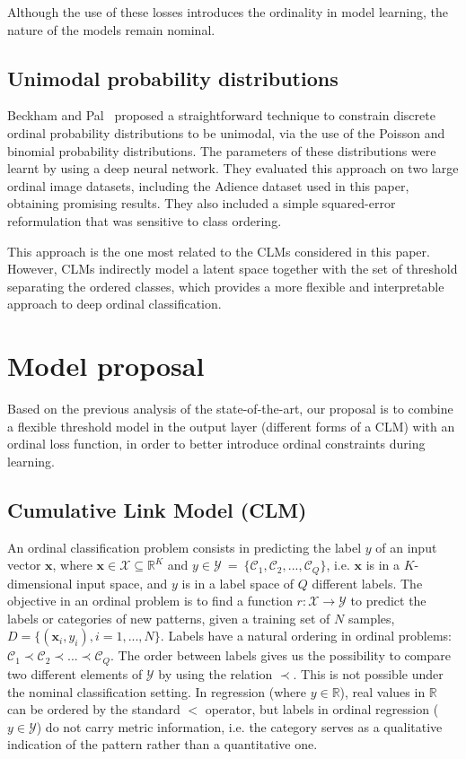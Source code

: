 \documentclass[preprint]{elsarticle}
\begin{document}
Although the use of these losses introduces the ordinality in model learning, the nature of the models remain nominal.


\subsection{Unimodal probability distributions}

Beckham and Pal~\cite{beckham2017unimodal} proposed a straightforward technique to constrain discrete ordinal probability distributions to be unimodal, via the use of the Poisson and binomial probability distributions. The parameters of these distributions were learnt by using a deep neural network. They evaluated this approach on two large ordinal image datasets, including the Adience dataset used in this paper, obtaining promising results. They also included a simple squared-error reformulation \cite{beckham2016simple} that was sensitive to class ordering.

This approach is the one most related to the CLMs considered in this paper. However, CLMs indirectly model a latent space together with the set of threshold separating the ordered classes, which provides a more flexible and interpretable approach to deep ordinal classification.	

\section{Model proposal}
\label{sect:modelProposal}

Based on the previous analysis of the state-of-the-art, our proposal is to combine a flexible threshold model in the output layer (different forms of a CLM) with an ordinal loss function, in order to better introduce ordinal constraints during learning.

\subsection{Cumulative Link Model (CLM)}
\label{sect:ordinalproblem}
An ordinal classification problem consists in predicting the label $y$ of an input vector $\mathbf{x}$, where $\mathbf{x} \in \mathcal{X} \subseteq \mathds{R}^K$ and $y \in \mathcal{Y}~=~\{\mathcal{C}_1, \mathcal{C}_2, ..., \mathcal{C}_Q\}$, i.e. $\mathbf{x}$ is in a $K$-dimensional input space, and $y$ is in a label space of $Q$ different labels. The objective in an ordinal problem is to find a function $r : \mathcal{X} \rightarrow \mathcal{Y}$ to predict the labels or categories of new patterns, given a training set of $N$ samples, $D = \{(\mathbf{x}_i, y_i), i = 1, ..., N\}$. Labels have a natural ordering in ordinal problems: $\mathcal{C}_1 \prec \mathcal{C}_2 \prec ... \prec \mathcal{C}_Q$. The order between labels gives us the possibility to compare two different elements of $\mathcal{Y}$ by using the relation $\prec$. This is not possible under the nominal classification setting. In regression (where $y \in \mathds{R}$), real values in $\mathds{R}$ can be ordered by the standard $<$ operator, but labels in ordinal regression ($y \in \mathcal{Y}$) do not carry metric information, i.e. the category serves as a qualitative indication of the pattern rather than a quantitative one.
\end{document}
